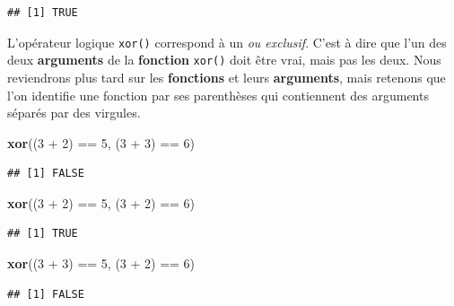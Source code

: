 \documentclass[twoside,symmetric]{book}
\newenvironment{Shaded}{}{}
\newcommand{\DecValTok}[1]{#1}
\newcommand{\KeywordTok}[1]{\textbf{#1}}
\newcommand{\NormalTok}[1]{#1}
\newcommand{\OperatorTok}[1]{#1}
\newcommand{\StringTok}[1]{#1}
\begin{document}
\begin{verbatim}
## [1] TRUE
\end{verbatim}

L'opérateur logique \texttt{xor()} correspond à un \emph{ou exclusif}. C'est à dire que l'un des deux \textbf{arguments} de la \textbf{fonction} \texttt{xor()} doit être vrai, mais pas les deux. Nous reviendrons plus tard sur les \textbf{fonctions} et leurs \textbf{arguments}, mais retenons que l'on identifie une fonction par ses parenthèses qui contiennent des arguments séparés par des virgules.

\begin{Shaded}
\begin{Highlighting}[]
\KeywordTok{xor}\NormalTok{((}\DecValTok{3} \OperatorTok{+}\StringTok{ }\DecValTok{2}\NormalTok{) }\OperatorTok{==}\StringTok{ }\DecValTok{5}\NormalTok{, (}\DecValTok{3} \OperatorTok{+}\StringTok{ }\DecValTok{3}\NormalTok{) }\OperatorTok{==}\StringTok{ }\DecValTok{6}\NormalTok{)}
\end{Highlighting}
\end{Shaded}

\begin{verbatim}
## [1] FALSE
\end{verbatim}

\begin{Shaded}
\begin{Highlighting}[]
\KeywordTok{xor}\NormalTok{((}\DecValTok{3} \OperatorTok{+}\StringTok{ }\DecValTok{2}\NormalTok{) }\OperatorTok{==}\StringTok{ }\DecValTok{5}\NormalTok{, (}\DecValTok{3} \OperatorTok{+}\StringTok{ }\DecValTok{2}\NormalTok{) }\OperatorTok{==}\StringTok{ }\DecValTok{6}\NormalTok{)}
\end{Highlighting}
\end{Shaded}

\begin{verbatim}
## [1] TRUE
\end{verbatim}

\begin{Shaded}
\begin{Highlighting}[]
\KeywordTok{xor}\NormalTok{((}\DecValTok{3} \OperatorTok{+}\StringTok{ }\DecValTok{3}\NormalTok{) }\OperatorTok{==}\StringTok{ }\DecValTok{5}\NormalTok{, (}\DecValTok{3} \OperatorTok{+}\StringTok{ }\DecValTok{2}\NormalTok{) }\OperatorTok{==}\StringTok{ }\DecValTok{6}\NormalTok{)}
\end{Highlighting}
\end{Shaded}

\begin{verbatim}
## [1] FALSE
\end{verbatim}
\end{document}
